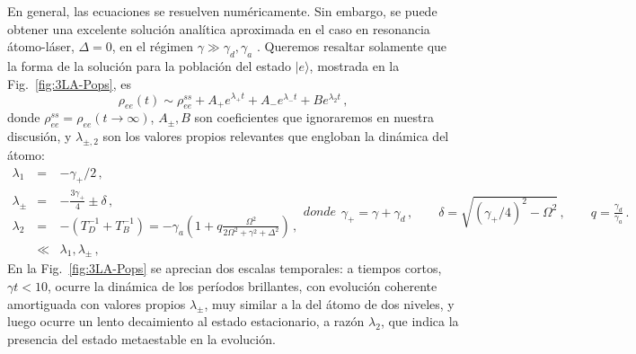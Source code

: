 \documentclass[superscriptaddress,12pt,amsmath]{revtex4-2}
\begin{document}
En general, las ecuaciones se resuelven num\'ericamente. Sin embargo, 
se puede obtener una excelente soluci\'on anal\'itica aproximada en el 
caso en resonancia \'atomo-l\'aser, $\Delta =0$, en el r\'egimen 
$\gamma \gg \gamma_d , \gamma_a$ \cite{CaRG16}. Queremos resaltar 
solamente que la forma de la soluci\'on para la poblaci\'on del estado 
$|e\rangle$, mostrada en la Fig.~\ref{fig:3LA-Pops}, es
%
\begin{equation} 		\label{eq:popE}
\rho_{ee}(t) \sim \rho_{ee}^{ss} +A_+ e^{\lambda_+ t} 
	+A_- e^{\lambda_- t}+B e^{\lambda_2 t}  \,,
\end{equation}
donde $\rho_{ee}^{ss} = \rho_{ee} (t \to \infty)$, $A_{\pm},B$ son 
coeficientes que ignoraremos en nuestra discusi\'on, y 
$\lambda_{\pm,2}$ son los valores propios relevantes que engloban 
la din\'amica del \'atomo: 
%
\begin{subequations}
\begin{eqnarray} 	
\lambda_1 &=& -\gamma_+/2 \,,  \\
%
\lambda_{\pm} &=& -\frac{3\gamma_+}{4} \pm \delta  \,,     \\
%
\lambda_2 &=& -(T_D^{-1} +T_B^{-1})   
	= -\gamma_a \left( 1+ q \frac{\Omega^2 }
	{ 2 \Omega^2 +\gamma^2 +\Delta^2 }  \right) 	\,,  
	\label{eq:small_eigenvalue} \\
	&\ll&  \lambda_1, \lambda_{\pm} \,,  \nonumber 
\end{eqnarray} 
donde 
%
\begin{eqnarray} 	
\gamma_+ = \gamma +\gamma_d \,,	 	\qquad 
\delta =  \sqrt{(\gamma_+/4)^2 - \Omega^2} \,, \qquad 
q = \frac{\gamma_d}{\gamma_a} \,. 
\end{eqnarray}    
\end{subequations}   
En la Fig.~\ref{fig:3LA-Pops} se aprecian dos escalas temporales: a 
tiempos cortos, $\gamma t < 10$, ocurre la din\'amica de los per\'iodos 
brillantes, con evoluci\'on coherente amortiguada con valores propios  
$\lambda_{\pm}$, muy similar a la del \'atomo de dos niveles, y luego 
ocurre un lento decaimiento al estado estacionario, a raz\'on $\lambda_2$, 
que indica la presencia del estado metaestable en la evoluci\'on. 
\end{document}
